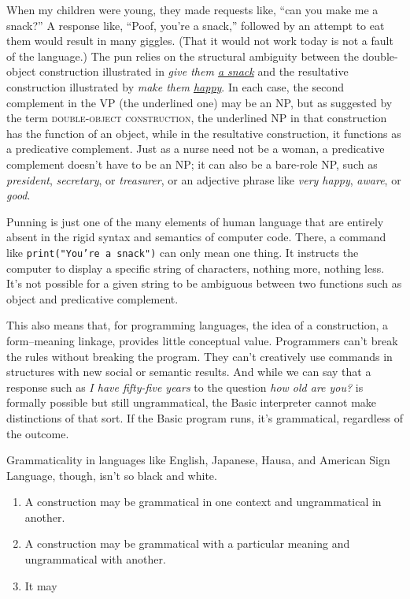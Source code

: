 When my children were young, they made requests like, \enquote{can you make me a snack?} A response like, \enquote{Poof, you're a snack,} followed by an attempt to eat them would result in many giggles. (That it would not work today is not a fault of the language.) The pun relies on the structural ambiguity between the double-object construction illustrated in \textit{give them \uline{a snack}} and the resultative construction illustrated by \textit{make them \uline{happy}}. In each case, the second complement in the VP (the underlined one) may be an NP, but as suggested by the term \textsc{double-object construction}, the underlined NP in that construction has the function of an object, while in the resultative construction, it functions as a predicative complement. Just as a nurse need not be a woman, a predicative complement doesn't have to be an NP; it can also be a bare-role NP, such as \textit{president}, \textit{secretary}, or \textit{treasurer}, or an adjective phrase like \textit{very happy}, \textit{aware}, or \textit{good}.

Punning is just one of the many elements of human language that are entirely absent in the rigid syntax and semantics of computer code. There, a command like \texttt{print("You're a snack")} can only mean one thing. It instructs the computer to display a specific string of characters, nothing more, nothing less. It's not possible for a given string to be ambiguous between two functions such as object and predicative complement.

This also means that, for programming languages, the idea of a construction, a form--meaning linkage, provides little conceptual value. Programmers can't break the rules without breaking the program. They can't creatively use commands in structures with new social or semantic results. And while we can say that a response such as \textit{I have fifty-five years} to the question \textit{how old are you?} is formally possible but still ungrammatical, the Basic interpreter cannot make distinctions of that sort. If the Basic program runs, it's grammatical, regardless of the outcome.

Grammaticality in languages like English, Japanese, Hausa, and American Sign Language, though, isn't so black and white.

\begin{enumerate}
    \item A construction may be grammatical in one context and ungrammatical in another.
    \item A construction may be grammatical with a particular meaning and ungrammatical with another.
    \item It may %
\end{enumerate}

